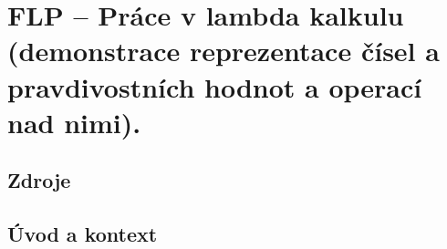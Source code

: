 

\graphicspath{{flp/prace_v_lambda_kalkulu/figures}}


\chapter{FLP -- Práce v lambda kalkulu (demonstrace reprezentace čísel a pravdivostních hodnot a operací nad
nimi).}


\section{Zdroje}

\begin{compactitem}
    \item {}
    \item {}
    \item {}
    \item {}
    \item {}
\end{compactitem}


\section{Úvod a kontext}

